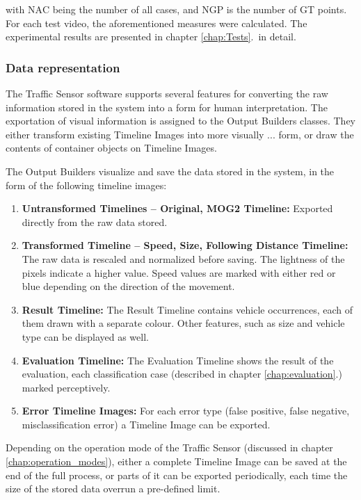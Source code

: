 with $\text{NAC}$ being the number of all cases, and $\text{NGP}$ is the number of GT points.
For each test video, the aforementioned measures were calculated.
The experimental results are presented in chapter \ref{chap:Tests}.~in detail.
\subsubsection{Data representation}
The Traffic Sensor software supports several features for converting the raw information stored in the system into a form for human interpretation.
The exportation of visual information is assigned to the Output Builders classes.
They either transform existing Timeline Images into more visually ... form, or draw the contents of container objects on Timeline Images.

The Output Builders visualize and save the data stored in the system, in the form of the following timeline images:
\begin{enumerate}
	\item \textbf{Untransformed Timelines -- Original, MOG2 Timeline: } Exported directly from the raw data stored.
	\item \textbf{Transformed Timeline -- Speed, Size, Following Distance Timeline: } The raw data is rescaled and normalized before saving. The lightness of the pixels indicate a higher value. Speed values are marked with either red or blue depending on the direction of the movement. 
	\item \textbf{Result Timeline: } The Result Timeline contains vehicle occurrences, each of them drawn with a separate colour. Other features, such as size and vehicle type can be displayed as well.
	\item \textbf{Evaluation Timeline: } The Evaluation Timeline shows the result of the evaluation, each classification case (described in chapter \ref{chap:evaluation}.) marked perceptively.
	\item \textbf{Error Timeline Images: } For each error type (false positive, false negative, misclassification error) a Timeline Image can be exported.
\end{enumerate} 

Depending on the operation mode of the Traffic Sensor (discussed in chapter \ref{chap:operation_modes}), either a complete Timeline Image can be saved at the end of the full process, or parts of it can be exported periodically, each time the size of the stored data overrun a pre-defined limit.


